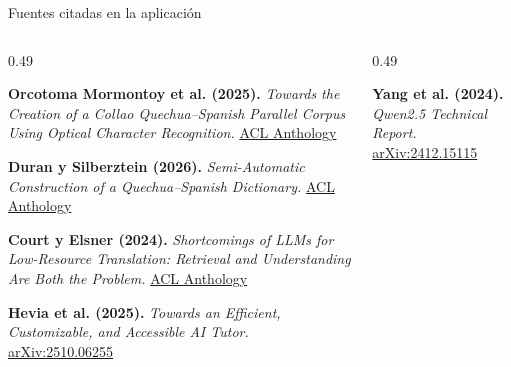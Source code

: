 \documentclass[aspectratio=169,10pt,spanish]{beamer}
\begin{document}
\begin{frame}{Fuentes citadas en la aplicación}
    \begin{columns}[T,onlytextwidth]
        \begin{column}{0.49\textwidth}
            \begin{tcolorbox}[colback=bpLightGray,colframe=bpBlue,arc=1.2mm]
                \scriptsize
                \textbf{Orcotoma Mormontoy et al. (2025).}
                \textit{Towards the Creation of a Collao Quechua--Spanish Parallel Corpus Using Optical Character Recognition.}
                \href{https://aclanthology.org/2025.globalnlp-1.1/}{ACL Anthology}
            \end{tcolorbox}
            \begin{tcolorbox}[colback=white,colframe=bpGold!90!black,arc=1.2mm]
                \scriptsize
                \textbf{Duran y Silberztein (2026).}
                \textit{Semi-Automatic Construction of a Quechua--Spanish Dictionary.}
                \href{https://aclanthology.org/2026.loresmt-1.9/}{ACL Anthology}
            \end{tcolorbox}
            \begin{tcolorbox}[colback=bpLightGray,colframe=bpRust,arc=1.2mm]
                \scriptsize
                \textbf{Court y Elsner (2024).}
                \textit{Shortcomings of LLMs for Low-Resource Translation: Retrieval and Understanding Are Both the Problem.}
                \href{https://aclanthology.org/2024.wmt-1.125/}{ACL Anthology}
            \end{tcolorbox}
            \begin{tcolorbox}[colback=white,colframe=bpBlue,arc=1.2mm]
                \scriptsize
                \textbf{Hevia et al. (2025).}
                \textit{Towards an Efficient, Customizable, and Accessible AI Tutor.}
                \href{https://arxiv.org/abs/2510.06255}{arXiv:2510.06255}
            \end{tcolorbox}
        \end{column}
        \begin{column}{0.49\textwidth}
            \begin{tcolorbox}[colback=bpLightGray,colframe=bpGold!90!black,arc=1.2mm]
                \scriptsize
                \textbf{Yang et al. (2024).}
                \textit{Qwen2.5 Technical Report.}
                \href{https://arxiv.org/abs/2412.15115}{arXiv:2412.15115}
            \end{tcolorbox}

\end{column}
\end{columns}
\end{frame}
\end{document}
